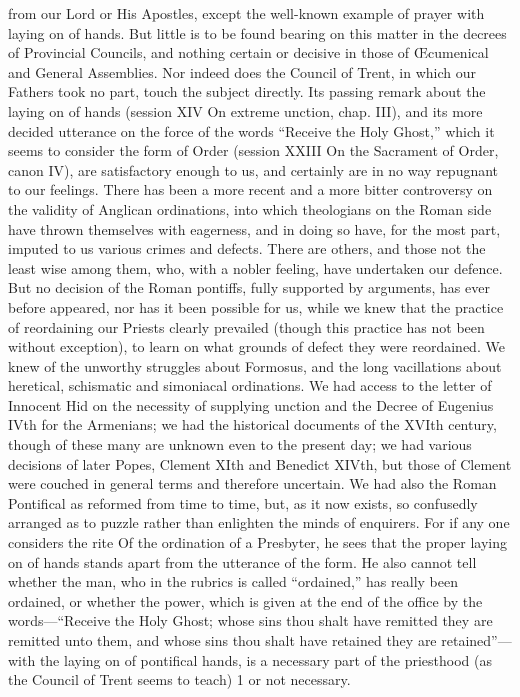 from our Lord or His Apostles, except the well-known example of prayer with laying on of hands. But little is to be found bearing on this matter in the decrees of Provincial Councils, and nothing certain or decisive in those of Œcumenical and General Assemblies. Nor indeed does the Council of Trent, in which our Fathers took no part, touch the subject directly. Its passing remark about the laying on of hands (session XIV On extreme unction, chap. III), and its more decided utterance on the force of the words “Receive the Holy Ghost,” which it seems to consider the form of Order (session XXIII On the Sacrament of Order, canon IV), are satisfactory enough to us, and certainly are in no way repugnant to our feelings. There has been a more recent and a more bitter controversy on the validity of Anglican ordinations, into which theologians on the Roman side have thrown themselves with eagerness, and in doing so have, for the most part, imputed to us various crimes and defects. There are others, and those not the least wise among them, who, with a nobler feeling, have undertaken our defence. But no decision of the Roman pontiffs, fully supported by arguments, has ever before appeared, nor has it been possible for us, while we knew that the practice of reordaining our Priests clearly prevailed (though this practice has not been without exception), to learn on what grounds of defect they were reordained. We knew of the unworthy struggles about Formosus, and the long vacillations about heretical, schismatic and simoniacal ordinations. We had access to the letter of Innocent Hid on the necessity of supplying unction and the Decree of Eugenius IVth for the Armenians; we had the historical documents of the XVIth century, though of these many are unknown even to the present day; we had various decisions of later Popes, Clement XIth and Benedict XIVth, but those of Clement were couched in general terms and therefore uncertain. We had also the Roman Pontifical as reformed from time to time, but, as it now exists, so confusedly arranged as to puzzle rather than enlighten the minds of enquirers. For if any one considers the rite Of the ordination of a Presbyter, he sees that the proper laying on of hands stands apart from the utterance of the form. He also cannot tell whether the man, who in the rubrics is called “ordained,” has really been ordained, or whether the power, which is given at the end of the office by the words—“Receive the Holy Ghost; whose sins thou shalt have remitted they are remitted unto them, and whose sins thou shalt have retained they are retained”—with the laying on of pontifical hands, is a necessary part of the priesthood (as the Council of Trent seems to teach) 1 or not necessary.

